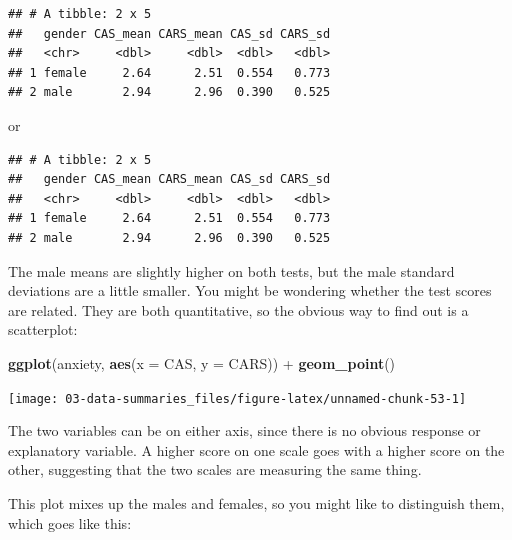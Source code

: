 \documentclass[]{tufte-book}
\newenvironment{Shaded}{}{}
\newcommand{\DataTypeTok}[1]{\textcolor[rgb]{0.56,0.13,0.00}{#1}}
\newcommand{\KeywordTok}[1]{\textcolor[rgb]{0.00,0.44,0.13}{\textbf{#1}}}
\newcommand{\NormalTok}[1]{#1}
\newcommand{\OperatorTok}[1]{\textcolor[rgb]{0.40,0.40,0.40}{#1}}
\newcommand{\StringTok}[1]{\textcolor[rgb]{0.25,0.44,0.63}{#1}}
\theoremstyle{definition}
\theoremstyle{definition}
\theoremstyle{definition}
\theoremstyle{remark}
\begin{document}
\begin{verbatim}
## # A tibble: 2 x 5
##   gender CAS_mean CARS_mean CAS_sd CARS_sd
##   <chr>     <dbl>     <dbl>  <dbl>   <dbl>
## 1 female     2.64      2.51  0.554   0.773
## 2 male       2.94      2.96  0.390   0.525
\end{verbatim}

or

\begin{Shaded}
\end{Shaded}

\begin{verbatim}
## # A tibble: 2 x 5
##   gender CAS_mean CARS_mean CAS_sd CARS_sd
##   <chr>     <dbl>     <dbl>  <dbl>   <dbl>
## 1 female     2.64      2.51  0.554   0.773
## 2 male       2.94      2.96  0.390   0.525
\end{verbatim}

The male means are slightly higher on both tests, but the male standard
deviations are a little smaller. You might be wondering whether the test
scores are related. They are both quantitative, so the obvious way to
find out is a scatterplot:

\begin{Shaded}
\begin{Highlighting}[]
\KeywordTok{ggplot}\NormalTok{(anxiety, }\KeywordTok{aes}\NormalTok{(}\DataTypeTok{x =}\NormalTok{ CAS, }\DataTypeTok{y =}\NormalTok{ CARS)) }\OperatorTok{+}\StringTok{ }\KeywordTok{geom_point}\NormalTok{()}
\end{Highlighting}
\end{Shaded}

\texttt{[image: 03-data-summaries\_files/figure-latex/unnamed-chunk-53-1]}

The two variables can be on either axis, since there is no obvious
response or explanatory variable. A higher score on one scale goes with
a higher score on the other, suggesting that the two scales are
measuring the same thing.

This plot mixes up the males and females, so you might like to
distinguish them, which goes like this:
\end{document}
